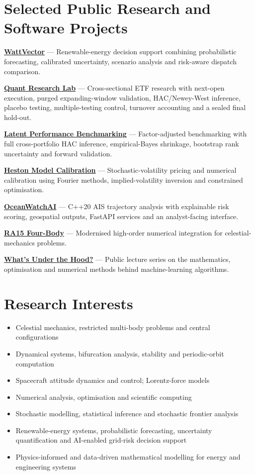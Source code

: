 \documentclass[10pt,a4paper]{article}
\newcommand{\project}[3]{\textbf{\href{#1}{#2}} --- #3\par}
\begin{document}
\section{Selected Public Research and Software Projects}
\project{https://wattvector.streamlit.app/}{WattVector}{Renewable-energy decision support combining probabilistic forecasting, calibrated uncertainty, scenario analysis and risk-aware dispatch comparison.}
\project{https://github.com/drmshoaib/quant-research-lab}{Quant Research Lab}{Cross-sectional ETF research with next-open execution, purged expanding-window validation, HAC/Newey-West inference, placebo testing, multiple-testing control, turnover accounting and a sealed final hold-out.}
\project{https://github.com/drmshoaib/latent-performance-benchmarking}{Latent Performance Benchmarking}{Factor-adjusted benchmarking with full cross-portfolio HAC inference, empirical-Bayes shrinkage, bootstrap rank uncertainty and forward validation.}
\project{https://github.com/drmshoaib/heston-model-calibration}{Heston Model Calibration}{Stochastic-volatility pricing and numerical calibration using Fourier methods, implied-volatility inversion and constrained optimisation.}
\project{https://github.com/drmshoaib/OceanWatch}{OceanWatchAI}{C++20 AIS trajectory analysis with explainable risk scoring, geospatial outputs, FastAPI services and an analyst-facing interface.}
\project{https://github.com/drmshoaib/ra15-fourbody-modern_version}{RA15 Four-Body}{Modernised high-order numerical integration for celestial-mechanics problems.}
\project{https://drmshoaib.github.io/whats-under-the-hood/}{What's Under the Hood?}{Public lecture series on the mathematics, optimisation and numerical methods behind machine-learning algorithms.}

\section{Research Interests}
\begin{itemize}
\item Celestial mechanics, restricted multi-body problems and central configurations
\item Dynamical systems, bifurcation analysis, stability and periodic-orbit computation
\item Spacecraft attitude dynamics and control; Lorentz-force models
\item Numerical analysis, optimisation and scientific computing
\item Stochastic modelling, statistical inference and stochastic frontier analysis
\item Renewable-energy systems, probabilistic forecasting, uncertainty quantification and AI-enabled grid-risk decision support
\item Physics-informed and data-driven mathematical modelling for energy and engineering systems
\end{itemize}
\end{document}
